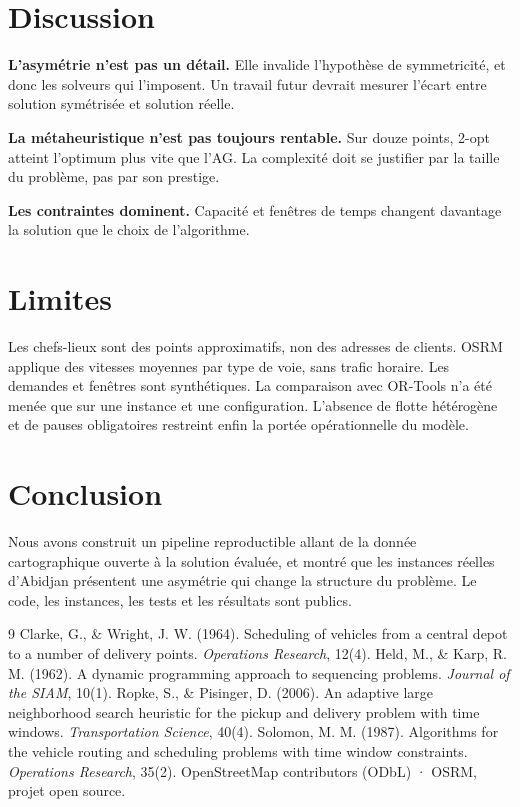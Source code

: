 \documentclass[11pt,a4paper]{article}
\begin{document}
\section{Discussion}

\textbf{L'asymétrie n'est pas un détail.} Elle invalide l'hypothèse de symmetricité, et donc les solveurs qui l'imposent. Un travail futur devrait mesurer l'écart entre solution symétrisée et solution réelle.

\textbf{La métaheuristique n'est pas toujours rentable.} Sur douze points, 2-opt atteint l'optimum plus vite que l'AG. La complexité doit se justifier par la taille du problème, pas par son prestige.

\textbf{Les contraintes dominent.} Capacité et fenêtres de temps changent davantage la solution que le choix de l'algorithme.

\section{Limites}

Les chefs-lieux sont des points approximatifs, non des adresses de clients. OSRM applique des vitesses moyennes par type de voie, sans trafic horaire. Les demandes et fenêtres sont synthétiques. La comparaison avec OR-Tools n'a été menée que sur une instance et une configuration. L'absence de flotte hétérogène et de pauses obligatoires restreint enfin la portée opérationnelle du modèle.

\section{Conclusion}

Nous avons construit un pipeline reproductible allant de la donnée cartographique ouverte à la solution évaluée, et montré que les instances réelles d'Abidjan présentent une asymétrie qui change la structure du problème. Le code, les instances, les tests et les résultats sont publics.

\begin{thebibliography}{9}
\small
{} Clarke, G., \& Wright, J. W. (1964). Scheduling of vehicles from a central depot to a number of delivery points. \emph{Operations Research}, 12(4).
 Held, M., \& Karp, R. M. (1962). A dynamic programming approach to sequencing problems. \emph{Journal of the SIAM}, 10(1).
 Ropke, S., \& Pisinger, D. (2006). An adaptive large neighborhood search heuristic for the pickup and delivery problem with time windows. \emph{Transportation Science}, 40(4).
 Solomon, M. M. (1987). Algorithms for the vehicle routing and scheduling problems with time window constraints. \emph{Operations Research}, 35(2).
 OpenStreetMap contributors (ODbL) · OSRM, projet open source.
\end{thebibliography}
\end{document}
